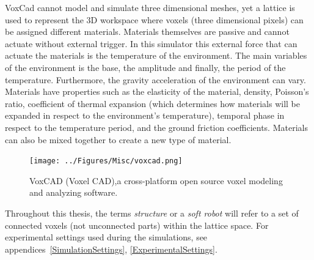 VoxCad cannot model and simulate three dimensional meshes, yet a lattice is used to represent the 3D workspace where voxels (three dimensional pixels) can be assigned different materials. Materials themselves are passive and cannot actuate without external trigger. In this simulator this external force that can actuate the materials is the temperature of the environment. The main variables of the environment is the base, the amplitude and finally, the period of the temperature. Furthermore, the gravity acceleration of the environment can vary. Materials have properties such as the elasticity of the material, density, Poisson's ratio, coefficient of thermal expansion (which determines how materials will be expanded in respect to the environment's temperature), temporal phase in respect to the temperature period, and the ground friction coefficients. Materials can also be mixed together to create a new type of material.

\begin{figure}[t!]
\centering
\texttt{[image: ../Figures/Misc/voxcad.png]}
\caption{VoxCAD (Voxel CAD),a cross-platform open source voxel modeling and analyzing software.}
\label{fig:VoxCAD}
\end{figure}

Throughout this thesis, the terms \textit{structure} or a \textit{soft robot} will refer to a set of connected voxels (not unconnected parts) within the lattice space. For experimental settings used during the simulations, see appendices~\ref{SimulationSettings}, \ref{ExperimentalSettings}.


